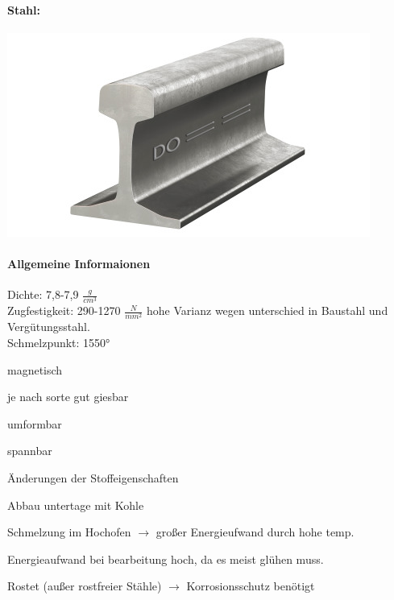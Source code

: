 \documentclass{article}
\begin{document}
\begin{multicols}{3}
  \paragraph{Stahl:}
\includegraphics[width=\linewidth]{stahl.jpg}
\paragraph{Allgemeine Informaionen}
Dichte: 7,8-7,9 $\frac{g}{cm^3}$\\
Zugfestigkeit: 290-1270 $\frac{N}{mm^2}$ hohe Varianz wegen unterschied in Baustahl und Vergütungsstahl.\\
Schmelzpunkt: 1550°
\begin{compactitem}
  \item magnetisch
  \item je nach sorte gut giesbar
  \item umformbar
  \item spannbar
  \item Änderungen der Stoffeigenschaften
\end{compactitem}


\begin{compactitem}
  \item Abbau untertage mit Kohle
  \item Schmelzung im Hochofen
  \subitem $\to$ großer Energieufwand durch hohe temp.
  \item Energieaufwand bei bearbeitung hoch, da es meist glühen muss.
  \item Rostet (außer rostfreier Stähle)
  \subitem $\to$ Korrosionsschutz benötigt
\end{compactitem}


\end{multicols}
\end{document}
